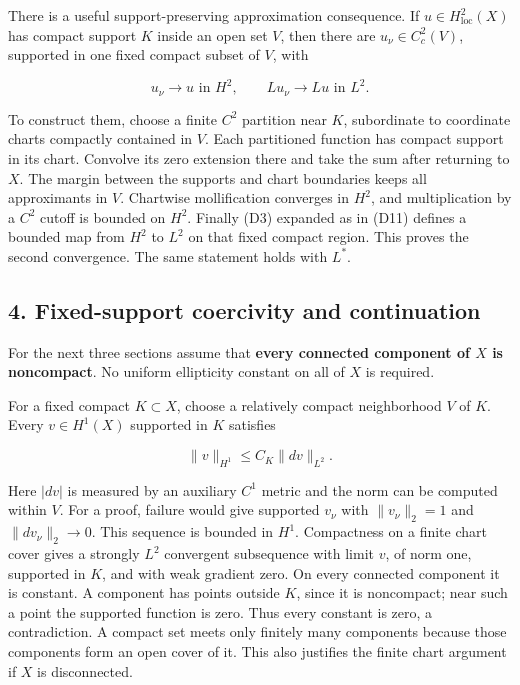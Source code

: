 \documentclass[
  11pt,
]{article}
\begin{document}
There is a useful support-preserving approximation consequence. If
\(u\in H^2_{\mathrm{loc}}(X)\) has compact support \(K\) inside an open
set \(V\), then there are \(u_\nu\in C_c^2(V)\), supported in one fixed
compact subset of \(V\), with

\[
 u_\nu\longrightarrow u\text{ in }H^2,
 \qquad Lu_\nu\longrightarrow Lu\text{ in }L^2.                  \tag{D13}
\]

To construct them, choose a finite \(C^2\) partition near \(K\),
subordinate to coordinate charts compactly contained in \(V\). Each
partitioned function has compact support in its chart. Convolve its zero
extension there and take the sum after returning to \(X\). The margin
between the supports and chart boundaries keeps all approximants in
\(V\). Chartwise mollification converges in \(H^2\), and multiplication
by a \(C^2\) cutoff is bounded on \(H^2\). Finally (D3) expanded as in
(D11) defines a bounded map from \(H^2\) to \(L^2\) on that fixed
compact region. This proves the second convergence. The same statement
holds with \(L^*\).

\subsection{4. Fixed-support coercivity and
continuation}\label{fixed-support-coercivity-and-continuation}

For the next three sections assume that \textbf{every connected
component of \(X\) is noncompact}. No uniform ellipticity constant on
all of \(X\) is required.

For a fixed compact \(K\subset X\), choose a relatively compact
neighborhood \(V\) of \(K\). Every \(v\in H^1(X)\) supported in \(K\)
satisfies

\[
                  \|v\|_{H^1}\leq C_K\|dv\|_{L^2}.               \tag{D14}
\]

Here \(|dv|\) is measured by an auxiliary \(C^1\) metric and the norm
can be computed within \(V\). For a proof, failure would give supported
\(v_\nu\) with \(\|v_\nu\|_2=1\) and \(\|dv_\nu\|_2\to0\). This sequence
is bounded in \(H^1\). Compactness on a finite chart cover gives a
strongly \(L^2\) convergent subsequence with limit \(v\), of norm one,
supported in \(K\), and with weak gradient zero. On every connected
component it is constant. A component has points outside \(K\), since it
is noncompact; near such a point the supported function is zero. Thus
every constant is zero, a contradiction. A compact set meets only
finitely many components because those components form an open cover of
it. This also justifies the finite chart argument if \(X\) is
disconnected.
\end{document}
